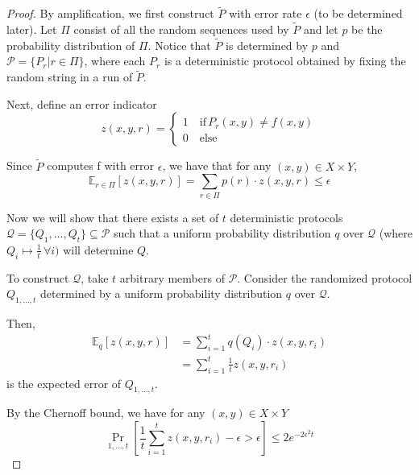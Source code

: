 \documentclass[letterpaper,11pt]{article}
\DeclareMathOperator{\PrOp}{Pr}
\begin{document}
\begin{proof}
    By amplification, we first construct $\tilde P$ with error rate $\epsilon$
    (to be determined later). Let $\Pi$ consist of all the random sequences
    used by $\tilde P$ and let $p$ be the probability distribution of $\Pi$.
    Notice that $\tilde P$ is determined by $p$ and
    $\mathcal{P} = \{P_r | r \in \Pi\}$, where each $P_r$ is a deterministic
    protocol obtained by fixing the random string in a run of $\tilde P$.

    Next, define an error indicator
    \begin{equation*}
        z(x, y, r) = \begin{cases}
            1\quad \text{if}\, P_r(x,y) \neq f(x, y) \\
            0\quad \text{else}
        \end{cases}
    \end{equation*}

    Since $\tilde P$ computes f with error $\epsilon$, we have that for any
    $(x, y) \in X \times Y$,
    \begin{equation*}
        \mathbb{E}_{r\in\Pi}\left[z(x, y, r)\right]
        = \sum_{r\in\Pi}{p(r) \cdot z(x, y, r)} \leq \epsilon
    \end{equation*}

    Now we will show that there exists a set of $t$ deterministic protocols
    $\mathcal{Q} = \{Q_1, \ldots, Q_t\} \subseteq \mathcal{P}$ such
    that a uniform probability distribution $q$ over $\mathcal{Q}$
    (where $Q_i \mapsto \frac{1}{t}\,\forall i)$ will determine $Q$.

    To construct $\mathcal{Q}$, take $t$ arbitrary members of $\mathcal{P}$.
    Consider the randomized protocol $Q_{1,\ldots,t}$ determined by a uniform
    probability distribution $q$ over $\mathcal{Q}$.

    Then,
    \begin{align*}
        \mathbb{E}_q\left[z(x, y, r)\right]
        &= \sum_{i=1}^t {q(Q_i) \cdot z(x, y, r_i)} \\
        &= \sum_{i=1}^t {\frac{1}{t} z(x, y, r_i)}
    \end{align*}
    is the expected error of $Q_{1,\ldots,t}$.

    By the Chernoff bound, we have for any $(x, y) \in X \times Y$
    \begin{equation*}
        \PrOp_{1, \ldots, t}\left[
            \frac{1}{t}\sum_{i=1}^t {z(x, y, r_i)} - \epsilon > \epsilon
        \right]
        \leq
        2e^{-2\epsilon^2 t}
    \end{equation*}


\end{proof}
\end{document}
